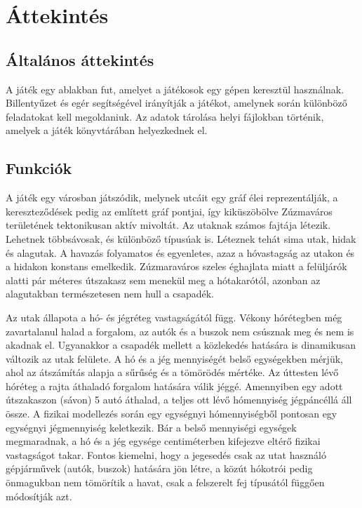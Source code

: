 \section{Áttekintés}
\subsection{Általános áttekintés}
\par{A játék egy ablakban fut, amelyet a játékosok egy gépen keresztül használnak. Billentyűzet és egér segítségével irányítják a játékot, amelynek során különböző feladatokat kell megoldaniuk.  Az adatok tárolása helyi fájlokban történik, amelyek a játék könyvtárában helyezkednek el.}

\subsection{Funkciók}
\par{A játék egy városban játszódik, melynek utcáit egy gráf élei reprezentálják, a kereszteződések pedig az említett gráf pontjai, így kiküszöbölve Zúzmaváros területének tektonikusan aktív mivoltát.
Az utaknak számos fajtája létezik. Lehetnek többsávosak, és különböző típusúak is. Léteznek tehát sima utak, hidak és alagutak. A havazás folyamatos és egyenletes, azaz a hóvastagság az utakon és a hidakon konstans emelkedik. Zúzmaraváros szeles éghajlata miatt a felüljárók alatti pár méteres útszakasz sem menekül meg a hótakarótól, azonban az alagutakban természetesen nem hull a csapadék.}
\par{Az utak állapota a hó- és jégréteg vastagságától függ. Vékony hórétegben még zavartalanul halad a forgalom, az autók és a buszok nem csúsznak meg és nem is akadnak el.
Ugyanakkor a csapadék mellett a közlekedés hatására is dinamikusan változik az utak felülete. A hó és a jég mennyiségét belső egységekben mérjük, ahol az átszámítás alapja a sűrűség és a tömörödés mértéke. Az úttesten lévő hóréteg a rajta áthaladó forgalom hatására válik jéggé. Amennyiben egy adott útszakaszon (sávon) 5 autó áthalad, a teljes ott lévő hómennyiség jégpáncéllá áll össze. A fizikai modellezés során egy egységnyi hómennyiségből pontosan egy egységnyi jégmennyiség keletkezik. Bár a belső mennyiségi egységek megmaradnak, a hó és a jég egysége centiméterben kifejezve eltérő fizikai vastagságot takar.
Fontos kiemelni, hogy a jegesedés csak az utat használó gépjárművek (autók, buszok) hatására jön létre, a közút hókotrói pedig önmagukban nem tömörítik a havat, csak a felszerelt fej típusától függően módosítják azt.}
